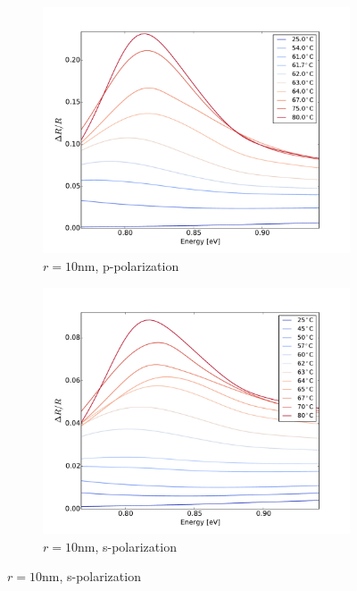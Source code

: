 %
\begin{figure}[h!]
    \centering
    \begin{subfigure}[b]{0.49\textwidth}
        \centering
        \includegraphics[width=\textwidth]{Results/Sim1/dR_lowE.pdf}
        \caption{$r=10$nm, p-polarization}
        \label{fig:dRlowE1}
    \end{subfigure}
    \begin{subfigure}[b]{0.49\textwidth}
        \centering
        \includegraphics[width=\textwidth]{Results/Sim2/dR_lowE.pdf}
        \caption{$r=10$nm, s-polarization}
        \label{fig:dRlowE2}

\end{subfigure}
\end{figure}
